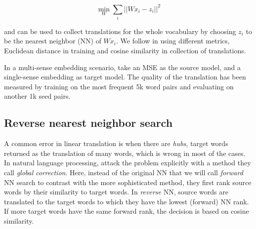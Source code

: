 \documentclass[11pt]{article}
\begin{document}
\[\min_W \sum_i || Wx_i - z_i ||^2 \]

\noindent and can be used to collect translations for the whole vocabulary by
choosing $z_i$ to be the nearest neighbor (NN) of $Wx_i$.
We follow \cite{Mikolov:2013x} in using different metrics, Euclidean
 distance in training and cosine similarity in collection of translations.


In a multi-sense embedding scenario, \cite{Borbely:2016} take an MSE as the
source model, and a single-sense embedding as target model.  The quality of the
translation has been measured by training on the most frequent 5k word pairs
and evaluating on another 1k seed pairs.



% 
% 
% 
% 

\subsection{Reverse nearest neighbor search}



A common error in linear translation is when there are \emph{hubs}, target
words returned as the translation of many words, which is wrong in most of the
cases.  In natural language processing, \cite{Dinu:2015} attack the problem
explicitly with a method they call \emph{global correction}.  Here, instead of
the original NN that we will call \emph{forward} NN search to contrast with the
more sophisticated method, they first rank source words by their similarity to
target words. In \emph{reverse} NN, source words are translated to the target
words to which they have the lowest (forward) NN rank.  If more target
words have the same forward rank, the decision is based on cosine similarity.
\end{document}
